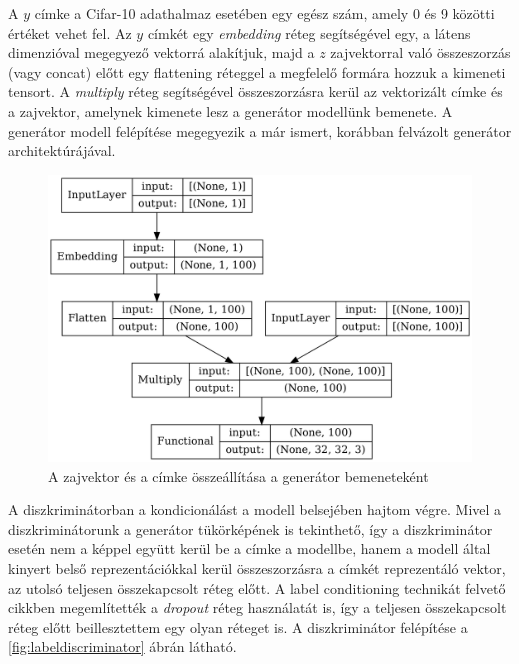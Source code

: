 A $y$ címke a Cifar-10 adathalmaz esetében egy egész szám, amely 0 és 9 közötti értéket vehet fel. Az $y$ címkét egy \textit{embedding} réteg segítségével egy, a látens dimenzióval megegyező vektorrá alakítjuk, majd a $z$ zajvektorral való összeszorzás (vagy concat) előtt egy flattening réteggel a megfelelő formára hozzuk a kimeneti tensort.
A \textit{multiply} réteg segítségével összeszorzásra kerül az vektorizált címke és a zajvektor, amelynek kimenete lesz a generátor modellünk bemenete. A generátor modell felépítése megegyezik a már ismert, korábban felvázolt generátor architektúrájával. 

\begin{figure}[h]
	\centering
	\includegraphics[width=13cm]{images/label_noise_embedding.png}
	\caption{A zajvektor és a címke összeállítása a generátor bemeneteként}
	\label{fig:labelnoiseembedding}
\end{figure}

A diszkriminátorban a kondicionálást a modell belsejében hajtom végre. Mivel a diszkriminátorunk a generátor tükörképének is tekinthető, így a diszkriminátor esetén nem a képpel együtt kerül be a címke a modellbe, hanem a modell által kinyert belső reprezentációkkal kerül összeszorzásra a címkét reprezentáló vektor, az utolsó teljesen összekapcsolt réteg előtt. A label conditioning technikát felvető cikkben megemlítették a \textit{dropout} réteg használatát is, így a teljesen összekapcsolt réteg előtt beillesztettem egy olyan réteget is.
A diszkriminátor felépítése a \ref{fig:labeldiscriminator} ábrán látható.

